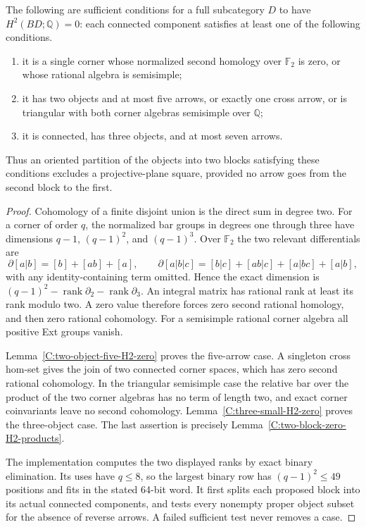 \begin{proposition}
\label{C:exact-block-cut-flags}
The following are sufficient conditions for a full subcategory
$D$ to have $H^2(BD;\mathbb Q)=0$: each connected component
satisfies at least one of the following conditions.
\begin{enumerate}
\item it is a single corner whose normalized second homology
over $\mathbb F_2$ is zero, or whose rational algebra is semisimple;
\item it has two objects and at most five arrows, or exactly
one cross arrow, or is triangular with both corner algebras
semisimple over $\mathbb Q$;
\item it is connected, has three objects, and at most seven arrows.
\end{enumerate}
Thus an oriented partition of the objects into two blocks satisfying
these conditions excludes a projective-plane square, provided no
arrow goes from the second block to the first.
\end{proposition}
\begin{proof}
Cohomology of a finite disjoint union is the direct sum in degree
two.  For a corner of order $q$, the normalized bar groups in
degrees one through three have dimensions $q-1$, $(q-1)^2$,
and $(q-1)^3$.  Over $\mathbb F_2$ the two relevant differentials are
\[
 \partial[a|b]=[b]+[ab]+[a],\qquad
 \partial[a|b|c]=[b|c]+[ab|c]+[a|bc]+[a|b],
\]
with any identity-containing term omitted.
Hence the exact dimension is
$(q-1)^2-\operatorname{rank}\partial_2-
\operatorname{rank}\partial_3$.  An integral matrix has rational
rank at least its rank modulo two.  A zero value therefore forces
zero second rational homology, and then zero rational cohomology.
For a semisimple rational corner algebra all positive Ext groups
vanish.

Lemma~\ref{C:two-object-five-H2-zero} proves the five-arrow case.
A singleton cross hom-set gives the join of two connected corner
spaces, which has zero second rational cohomology.  In the
triangular semisimple case the relative bar over the product of
the two corner algebras has no term of length two, and exact
corner coinvariants leave no second cohomology.
Lemma~\ref{C:three-small-H2-zero} proves the three-object case.
The last assertion is precisely
Lemma~\ref{C:two-block-zero-H2-products}.

The implementation  computes
the two displayed ranks by exact binary elimination.  Its uses
have $q\leq8$, so the largest binary row has $(q-1)^2\leq49$
positions and fits in the stated 64-bit word.  It first splits
each proposed block into its actual connected components, and
tests every nonempty proper object subset for the absence of
reverse arrows.  A failed sufficient test never removes a case.
\end{proof}

